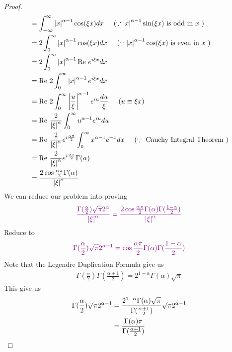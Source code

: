 \documentclass{report}
\begin{document}
\begin{proof}
\begin{align*}
&=\int_{-\infty}^{\infty}\left|x\right|^{\alpha -1}\cos (\xi x)dx\hspace{0.5cm}(\because \left|x\right|^{\alpha -1}\sin (\xi x)\text{ is odd in $x$ })\\
&=2\int_{0}^{\infty}\left|x\right|^{\alpha -1}\cos (\xi x)dx\hspace{0.5cm}(\because \left|x\right|^{\alpha -1}\cos (\xi x)\text{ is even in $x$ })\\
&=2\int_{0}^{\infty}\left|x\right|^{\alpha -1}\text{Re }e^{i \xi x}dx\\
&=\text{Re }2\int_{0}^{\infty}\left|x\right|^{\alpha -1}e^{i \xi x}dx\\
&=\text{Re }2\int_{0}^{\infty} \left|\frac{u}{\xi}\right|^{\alpha -1}e^{iu}\frac{du}{\xi}\hspace{0.5cm}( u\equiv\xi x)\\
&=\text{Re } \frac{2}{\left|\xi\right|^{\alpha }}\int_0^{\infty}u^{\alpha -1}e^{iu}du\\
&=\text{Re }\frac{2}{\left|\xi\right|^{\alpha }}e^{i \frac{\alpha \pi}{2}}\int_0^{\infty}x^{\alpha -1}e^{-x}dx\hspace{0.5cm}(\because \text{ Cauchy Integral Theorem })\\
&=\text{Re }\frac{2}{\left|\xi\right|^{\alpha }}e^{i \frac{\alpha \pi}{2}}\Gamma(\alpha )\\
&=\frac{2\cos \frac{\alpha \pi}{2}\Gamma (\alpha )}{\left|\xi\right|^{\alpha }}
\end{align*}
We can reduce our problem into proving 
\begin{align*}
  \textcolor{violet}{\frac{\Gamma (\frac{\alpha}{2})\sqrt{\pi} 2^{\alpha }}{\left|\xi\right|^{\alpha }}=\frac{2\cos \frac{\alpha \pi}{2}\Gamma (\alpha )\Gamma (\frac{1-\alpha }{2})}{\left|\xi\right|^{\alpha }}}
\end{align*}
Reduce to 
\begin{align*}
  \textcolor{violet}{\Gamma (\frac{\alpha }{2})\sqrt{\pi} 2^{\alpha -1}=\cos \frac{\alpha \pi}{2}\Gamma (\alpha )\Gamma (\frac{1-\alpha }{2})}
\end{align*}
Note that the Legendre Duplication Formula give us 
\begin{align*}
\Gamma (\frac{\alpha }{2})\Gamma (\frac{\alpha +1}{2})=2^{1-\alpha }\Gamma (\alpha )\sqrt{\pi} 
\end{align*}
This give us 
\begin{align}
\label{game1}
\Gamma (\frac{\alpha}{2})\sqrt{\pi}2^{\alpha -1}&= \frac{2^{1-\alpha }\Gamma (\alpha )\sqrt{\pi} }{\Gamma (\frac{\alpha +1}{2})}\sqrt{\pi} 2^{\alpha -1}\notag\\
&=\frac{\Gamma (\alpha )\pi }{\Gamma (\frac{\alpha +1}{2})}

\end{align}
\end{proof}
\end{document}
